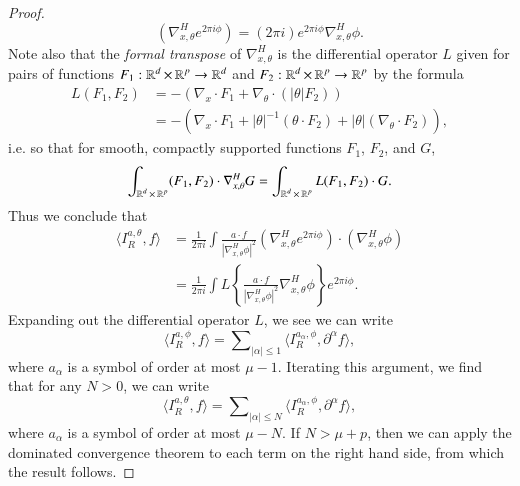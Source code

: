 \begin{proof}
    \begin{equation}
        (\nabla_{x,\theta}^H e^{2 \pi i \phi} ) = (2 \pi i) e^{2 \pi i \phi} \nabla_{x,\theta}^H \phi.
    \end{equation}
    Note also that the \emph{formal transpose} of $\nabla_{x,\theta}^H$ is the differential operator $L$ given for pairs of functions $F_1: \operatorname{\mathbb{R}}^d \times \operatorname{\mathbb{R}}^p \to \operatorname{\mathbb{R}}^d$ and $F_2: \operatorname{\mathbb{R}}^d \times \operatorname{\mathbb{R}}^p \to \operatorname{\mathbb{R}}^p$ by the formula
    \begin{equation}
    \begin{split}
        L(F_1, F_2) &= - ( \nabla_x \cdot F_1 + \nabla_\theta \cdot ( |\theta| F_2 ))\\
        &= - \left( \nabla_x \cdot F_1 + |\theta|^{-1} (\theta \cdot F_2) + |\theta| (\nabla_\theta \cdot F_2) \right),
    \end{split}
    \end{equation}
    i.e. so that for smooth, compactly supported functions $F_1$, $F_2$, and $G$,
    \begin{equation}
        \int_{\operatorname{\mathbb{R}}^d \times \operatorname{\mathbb{R}}^p} (F_1,F_2) \cdot \nabla^H_{x,\theta} G = \int_{\operatorname{\mathbb{R}}^d \times \operatorname{\mathbb{R}}^p} L(F_1,F_2) \cdot G.
    \end{equation}
    Thus we conclude that
    \begin{equation}
    \begin{split}
        \langle I^{a,\theta}_R, f \rangle &= \frac{1}{2 \pi i} \int \frac{a \cdot f}{|\nabla_{x,\theta}^H \phi|^2} \left( \nabla_{x,\theta}^H e^{2 \pi i \phi} \right) \cdot (\nabla_{x,\theta}^H \phi)\\
        &= \frac{1}{2 \pi i} \int L \left\{ \frac{a \cdot f}{|\nabla_{x,\theta}^H \phi|^2} \nabla_{x,\theta}^H \phi \right\} e^{2 \pi i \phi}.
    \end{split}
    \end{equation}
    Expanding out the differential operator $L$, we see we can write
    \begin{equation}
        \langle I^{a,\phi}_R, f \rangle = \sum\nolimits_{|\alpha| \leq 1} \langle I^{a_\alpha, \phi}_R, \partial^\alpha \! f \rangle,
    \end{equation}
    where $a_\alpha$ is a symbol of order at most $\mu - 1$. Iterating this argument, we find that for any $N > 0$, we can write
    \begin{equation}
        \langle I^{a,\theta}_R, f \rangle = \sum\nolimits_{|\alpha| \leq N} \langle I^{a_\alpha, \phi}_{R}, \partial^\alpha\! f \rangle,
    \end{equation}
    where $a_{\alpha}$ is a symbol of order at most $\mu - N$. If $N > \mu + p$, then we can apply the dominated convergence theorem to each term on the right hand side, from which the result follows.
\end{proof}










